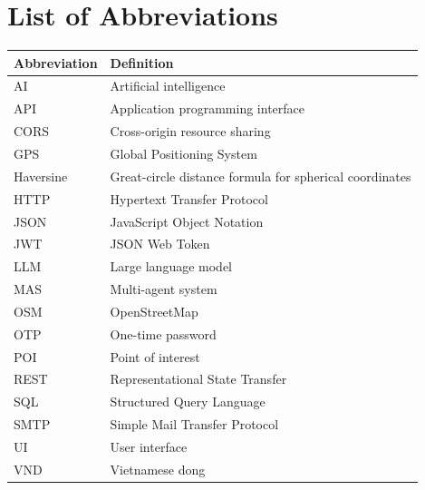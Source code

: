 \documentclass{sicaireport}
\begin{document}
\chapter*{List of Abbreviations}
\begin{table}[htbp]
    \centering
    \renewcommand{\arraystretch}{1.3}
    \begin{tabularx}{\textwidth}{p{3.2cm} X}
        \toprule
        \textbf{Abbreviation} & \textbf{Definition} \\
        \midrule
        AI & Artificial intelligence \\
        API & Application programming interface \\
        CORS & Cross-origin resource sharing \\
        GPS & Global Positioning System \\
        Haversine & Great-circle distance formula for spherical coordinates \\
        HTTP & Hypertext Transfer Protocol \\
        JSON & JavaScript Object Notation \\
        JWT & JSON Web Token \\
        LLM & Large language model \\
        MAS & Multi-agent system \\
        OSM & OpenStreetMap \\
        OTP & One-time password \\
        POI & Point of interest \\
        REST & Representational State Transfer \\
        SQL & Structured Query Language \\
        SMTP & Simple Mail Transfer Protocol \\
        UI & User interface \\
        VND & Vietnamese dong \\
        \bottomrule
    \end{tabularx}
\end{table}
\clearpage

\setcounter{page}{1}







\clearpage
\printbibliography[heading=bibintoc,title={References}]

\clearpage


\clearpage

\end{document}
